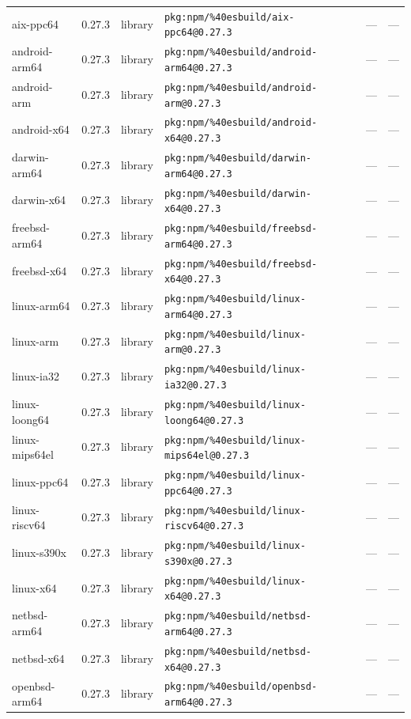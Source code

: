 \documentclass[11pt]{article}
\begin{document}
\begin{longtable}{|l|l|l|p{2.2cm}|l|p{4cm}|}
aix-ppc64 & 0.27.3 & library & \texttt{pkg:npm/\%40esbuild/aix-ppc64@0.27.3} & — & — \\
android-arm64 & 0.27.3 & library & \texttt{pkg:npm/\%40esbuild/android-arm64@0.27.3} & — & — \\
android-arm & 0.27.3 & library & \texttt{pkg:npm/\%40esbuild/android-arm@0.27.3} & — & — \\
android-x64 & 0.27.3 & library & \texttt{pkg:npm/\%40esbuild/android-x64@0.27.3} & — & — \\
darwin-arm64 & 0.27.3 & library & \texttt{pkg:npm/\%40esbuild/darwin-arm64@0.27.3} & — & — \\
darwin-x64 & 0.27.3 & library & \texttt{pkg:npm/\%40esbuild/darwin-x64@0.27.3} & — & — \\
freebsd-arm64 & 0.27.3 & library & \texttt{pkg:npm/\%40esbuild/freebsd-arm64@0.27.3} & — & — \\
freebsd-x64 & 0.27.3 & library & \texttt{pkg:npm/\%40esbuild/freebsd-x64@0.27.3} & — & — \\
linux-arm64 & 0.27.3 & library & \texttt{pkg:npm/\%40esbuild/linux-arm64@0.27.3} & — & — \\
linux-arm & 0.27.3 & library & \texttt{pkg:npm/\%40esbuild/linux-arm@0.27.3} & — & — \\
linux-ia32 & 0.27.3 & library & \texttt{pkg:npm/\%40esbuild/linux-ia32@0.27.3} & — & — \\
linux-loong64 & 0.27.3 & library & \texttt{pkg:npm/\%40esbuild/linux-loong64@0.27.3} & — & — \\
linux-mips64el & 0.27.3 & library & \texttt{pkg:npm/\%40esbuild/linux-mips64el@0.27.3} & — & — \\
linux-ppc64 & 0.27.3 & library & \texttt{pkg:npm/\%40esbuild/linux-ppc64@0.27.3} & — & — \\
linux-riscv64 & 0.27.3 & library & \texttt{pkg:npm/\%40esbuild/linux-riscv64@0.27.3} & — & — \\
linux-s390x & 0.27.3 & library & \texttt{pkg:npm/\%40esbuild/linux-s390x@0.27.3} & — & — \\
linux-x64 & 0.27.3 & library & \texttt{pkg:npm/\%40esbuild/linux-x64@0.27.3} & — & — \\
netbsd-arm64 & 0.27.3 & library & \texttt{pkg:npm/\%40esbuild/netbsd-arm64@0.27.3} & — & — \\
netbsd-x64 & 0.27.3 & library & \texttt{pkg:npm/\%40esbuild/netbsd-x64@0.27.3} & — & — \\
openbsd-arm64 & 0.27.3 & library & \texttt{pkg:npm/\%40esbuild/openbsd-arm64@0.27.3} & — & — \\

\end{longtable}
\end{document}
